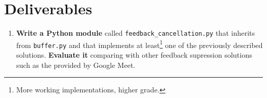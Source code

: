 \section{Deliverables}

\begin{enumerate}
\item
\textbf{Write a Python module} called \texttt{feedback\_cancellation.py} that inherits
from \texttt{buffer.py} and that implements at least\footnote{More
  working implementations, higher grade.} one of the previously
described solutions.
\textbf{Evaluate it} comparing with other feedback supression solutions such as the provided by Google Meet.
\end{enumerate}

\begin{comment}
More concretely:

\begin{enumerate}

\item If you implement the ``$s(t)$ delay and subtract solution'',
  you must estimate $a$, $d$ and perform the signals subtraction to
  remove the feedback signal ($s(t)$). 

\item In a ``$s(t)$ delay and subtract solution'', if you also
  consider the frequency response of the near-end audioset to estimate
  a better feedback signal, first you will need to find ${\mathbf H}$ (the
  discrete frequency response of your audioset). For this, the
  near-end speaker should generate an impulse signal
  ${\mathbf \delta}$, and in absence of any other sound signal, record
  the echo and compute its Fourier transform (it is a good idea to
  repeat this process several times to obtain a better estimation of
  ${\mathbf H}$). Finally, .

  Notice that the frequency characterization of the far-end audioset
  can be also used in a ``$n(t)$ delay and subtract
  solution''. Remember that filtering operations must be implemented
  with convolutions in the temporal domain, but are dot products in
  the frequency domain.
  
\item Use LMS to find a estimation of the echo signal and perform the
  echo cancellation. In this case, consider the use of a thread to
  compute the coefficients of the LMS filter
  (Equation~\eqref{eq:update} can run with a cadence much higher than
  a sample-time) and compute the estimated feedback signal
  (Equation~\eqref{eq:LMS_feedback}) for every chunk. Notice that for
  doing that, we will require the first $k$ samples of the next chunk.


\end{comment}
